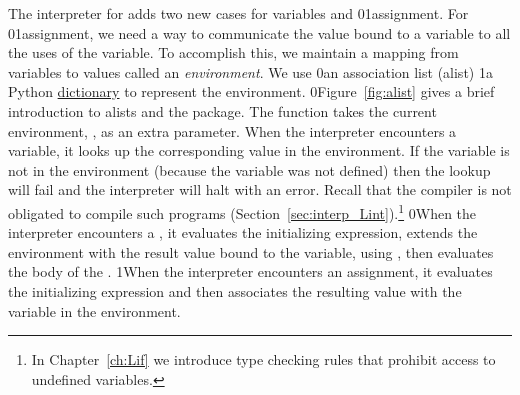 \documentclass[7x10]{TimesAPriori_MIT}%
\def\racketEd{0}
\def\pythonEd{1}
\def\edition{1}
\newcommand{\racket}[1]{{\if\edition\racketEd{#1}\fi}}
\newcommand{\pythonColor}[0]{}
\newcommand{\python}[1]{{\if\edition\pythonEd\pythonColor #1\fi}}
\numberwithin{theorem}{chapter}
\numberwithin{definition}{chapter}
\numberwithin{equation}{chapter}
\begin{document}
The interpreter for \LangVar{} adds two new cases for
variables and \racket{}\python{assignment}. For
\racket{}\python{assignment}, we need a way to communicate the
value bound to a variable to all the uses of the variable. To
accomplish this, we maintain a mapping from variables to values called
an \emph{environment}.
%
We use
%
\racket{an association list (alist) }%
%
\python{a Python \href{https://docs.python.org/3.10/library/stdtypes.html\#mapping-types-dict}{dictionary} }%
%
to represent the environment.
%
\racket{Figure~\ref{fig:alist} gives a brief introduction to alists
  and the \code{racket/dict} package.}
%
The  function takes the current environment,
, as an extra parameter.  When the interpreter encounters a
variable, it looks up the corresponding value in the environment. If
the variable is not in the environment (because the variable was not
defined) then the lookup will fail and the interpreter will
halt with an error. Recall that the compiler is not obligated to
compile such programs (Section~\ref{sec:interp_Lint}).\footnote{In
  Chapter~\ref{ch:Lif} we introduce type checking rules that
  prohibit access to undefined variables.}
%
\racket{When the interpreter encounters a , it evaluates the
  initializing expression, extends the environment with the result
  value bound to the variable, using \code{dict-set}, then evaluates
  the body of the \key{Let}.}
%
\python{When the interpreter encounters an assignment, it evaluates
   the initializing expression and then associates the resulting value
   with the variable in the environment.}
\end{document}
